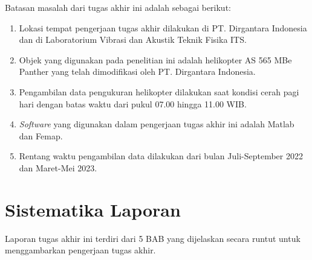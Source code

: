Batasan masalah dari tugas akhir ini adalah sebagai berikut:

\begin{enumerate}[nolistsep]

  \item Lokasi tempat pengerjaan tugas akhir dilakukan di PT. Dirgantara Indonesia dan di Laboratorium Vibrasi dan Akustik Teknik Fisika ITS.

  \item Objek yang digunakan pada penelitian ini adalah helikopter AS 565 MBe Panther yang telah dimodifikasi oleh PT. Dirgantara Indonesia.

  \item Pengambilan data pengukuran helikopter dilakukan saat kondisi cerah pagi hari dengan batas waktu dari pukul 07.00 hingga 11.00 WIB.
  
  \item \textit{Software} yang digunakan dalam pengerjaan tugas akhir ini adalah Matlab dan Femap.
  
  \item Rentang waktu pengambilan data dilakukan dari bulan Juli-September 2022 dan Maret-Mei 2023.

\end{enumerate}

\section{Sistematika Laporan}
\label{sec:sistematikalaporan}

Laporan tugas akhir ini terdiri dari 5 BAB yang dijelaskan secara runtut untuk menggambarkan pengerjaan tugas akhir.

